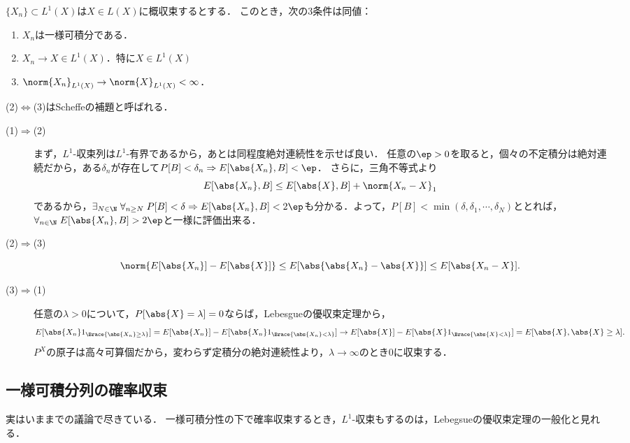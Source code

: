 \documentclass[uplatex,dvipdfmx]{jsreport}
\begin{document}
\begin{corollary}[概収束する可積分関数列の一様可積分性の特徴付け]
    $\{X_n\}\subset L^1(X)$は$X\in L(X)$に概収束するとする．
    このとき，次の3条件は同値：
    \begin{enumerate}
        \item $X_n$は一様可積分である．
        \item $X_n\to X\in L^1(X)$．特に$X\in L^1(X)$
        \item $\norm{X_n}_{L^1(X)}\to\norm{X}_{L^1(X)}<\infty$．
    \end{enumerate}
    (2)$\Leftrightarrow$(3)はScheffeの補題と呼ばれる．
\end{corollary}
\begin{Proof}\mbox{}
    \begin{description}
        \item[(1)$\Rightarrow$(2)] まず，$L^1$-収束列は$L^1$-有界であるから，あとは同程度絶対連続性を示せば良い．
        任意の$\ep>0$を取ると，個々の不定積分は絶対連続だから，ある$\delta_n$が存在して$P[B]<\delta_n\Rightarrow E[\abs{X_n},B]<\ep$．
        さらに，三角不等式より
        \[E[\abs{X_n},B]\le E[\abs{X},B]+\norm{X_n-X}_1\]
        であるから，$\exists_{N\in\N}\;\forall_{n\ge N}\;P[B]<\delta\Rightarrow E[\abs{X_n},B]<2\ep$も分かる．よって，$P[B]<\min(\delta,\delta_1,\cdots,\delta_N)$ととれば，$\forall_{n\in\N}\;E[\abs{X_n},B]>2\ep$と一様に評価出来る．
        \item[(2)$\Rightarrow$(3)] 
        \[\norm{E[\abs{X_n}]-E[\abs{X}]}\le E[\abs{\abs{X_n}-\abs{X}}]\le E[\abs{X_n-X}].\]
        \item[(3)$\Rightarrow$(1)] 任意の$\lambda>0$について，$P[\abs{X}=\lambda]=0$ならば，Lebesgueの優収束定理から，
        \begin{align*}
            E[\abs{X_n}1_{\Brace{\abs{X_n}\ge\lambda}}]&=E[\abs{X_n}]-E[\abs{X_n}1_{\Brace{\abs{X_n}<\lambda}}]\to E[\abs{X}]-E[\abs{X}1_{\Brace{\abs{X}<\lambda}}]=E[\abs{X},\abs{X}\ge\lambda].
        \end{align*}
        $P^X$の原子は高々可算個だから，変わらず定積分の絶対連続性より，$\lambda\to\infty$のとき$0$に収束する．
    \end{description}
\end{Proof}

\subsection{一様可積分列の確率収束}

\begin{tcolorbox}[colframe=ForestGreen, colback=ForestGreen!10!white,breakable,colbacktitle=ForestGreen!40!white,coltitle=black,fonttitle=\bfseries\sffamily,
title=]
    実はいままでの議論で尽きている．
    一様可積分性の下で確率収束するとき，$L^1$-収束もするのは，Lebegsueの優収束定理の一般化と見れる．
\end{tcolorbox}
\end{document}
